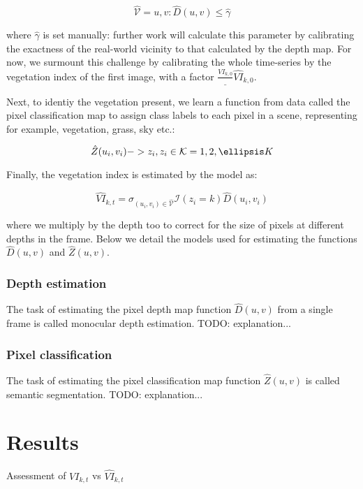 $$\hat{\mathcal{V}} = {u,v} : \hat{D}(u,v)\leq \hat{\gamma}$$

where $\hat{\gamma}$ is set manually: further work will calculate this parameter by calibrating the exactness of the real-world vicinity to that calculated by the depth map. For now, we surmount this challenge by calibrating the whole time-series by the vegetation index of the first image, with a factor $\frac{VI_{k,0}}_{\hat{VI}_{k,0}}$.

Next, to identiy the vegetation present, we learn a function from data called the pixel classification map to assign class labels to each pixel in a scene, representing for example, vegetation, grass, sky etc.:

$$\hat{Z}(u_i,v_i) -> z_i, z_i \in \mathcal{K} = {1,2, \ellipsis K}$$

Finally, the vegetation index is estimated by the model as:

$$\hat{VI}_{k,t}=\sigma_{(u_i,v_i)\in \hat{\mathcal{V}}} \mathcal{I}(z_i=k) \hat{D}(u_i,v_i)$$

where we multiply by the depth too to correct for the size of pixels at different depths in the frame. Below we detail the models used for estimating the functions $\hat{D}(u,v)$ and $\hat{Z}(u,v)$.

\subsubsection{Depth estimation}
The task of estimating the pixel depth map function $\hat{D}(u,v)$ from a single frame is called monocular depth estimation. TODO: explanation...

\subsubsection{Pixel classification}
The task of estimating the pixel classification map function $\hat{Z}(u,v)$ is called semantic segmentation. TODO: explanation...

\section{Results}

Assessment of $VI_{k,t}$ vs $\hat{VI}_{k,t}$